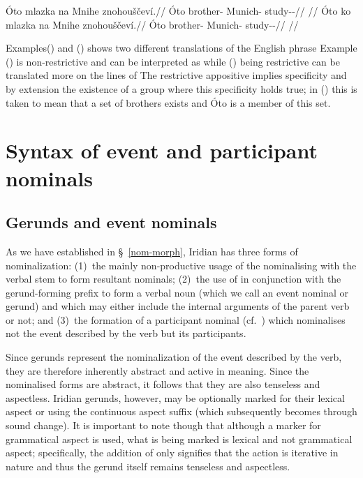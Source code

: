 \pex\a
\begingl{}
    \gla \'Oto mlazka na Mnihe znohouščeví.//
    \glb  \'Oto brother-\Dim{} \Loc{} Munich-\Acc{} study-\Av{}-\Cont{}//
    \glft {}//
\endgl
\a\begingl{}
    \gla \'Oto {ko} mlazka na Mnihe znohouščeví.//
    \glb  \'Oto \Lnk{} brother-\Dim{} \Loc{} Munich-\Acc{} study-\Av{}-\Cont{}//
    \glft {}//
\endgl
\xe

Examples() and () shows two different
translations of the English phrase  Example () is non-restrictive and can be
interpreted as 
while () being restrictive can be translated more on the
lines of  The
restrictive appositive implies specificity and by extension the existence of a
group where this specificity holds true; in () this is
taken to mean that a set of brothers exists and \'Oto is a member of this set.


\section{Syntax of event and participant nominals}\label{sec:nomz-syntax}

\subsection{Gerunds and event nominals}

As we have established in \S~\ref{nom-morph}, Iridian has three forms of
nominalization: (1)~the mainly non-productive usage of the
nominalising  with the verbal stem to form resultant nominals; (2)~the
use of  in conjunction with the gerund-forming prefix
 to form a verbal noun (which we call an event nominal or gerund)
and which may either include the internal arguments of the parent verb or not;
and (3)~the formation of a participant nominal (cf.~\cite{okuna}) which
nominalises not the event described by the verb but its participants.

Since gerunds represent the nominalization of the
event described by the verb, they are therefore inherently
abstract and active in meaning. Since the nominalised forms are abstract, it
follows that they are also tenseless and aspectless. Iridian gerunds, however,
may be optionally marked for their lexical aspect or
 using the continuous aspect suffix 
(which subsequently becomes  through sound change). It is important to
note though that although a marker for grammatical aspect is used,
what is being marked is lexical and not grammatical aspect; specifically, the
addition of  only signifies that the action is iterative in nature and
thus the gerund itself remains tenseless and aspectless.

